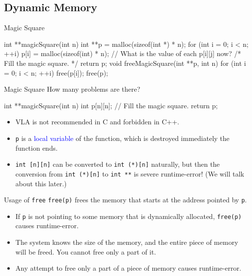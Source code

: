 \documentclass{beamer}
\newcommand{\blue}[1]{\textcolor{blue}{#1}}
\newcommand{\ttt}[1]{\texttt{#1}}
\theoremstyle{definition}
\begin{document}
\subsection{Dynamic Memory}

\begin{frame}[fragile]{Magic Square}
    \begin{cpp}
int **magicSquare(int n) {
  int **p = malloc(sizeof(int *) * n);
  for (int i = 0; i < n; ++i)
    p[i] = malloc(sizeof(int) * n);
  // What is the value of each p[i][j] now?
  /* Fill the magic square. */
  return p;
}
void freeMagicSquare(int **p, int n) {
  for (int i = 0; i < n; ++i)
    free(p[i]);
  free(p);
}
    \end{cpp}
\end{frame}

\begin{frame}[fragile]{Magic Square}
    How many problems are there?
    \begin{cpp}
int **magicSquare(int n) {
  int p[n][n];
  // Fill the magic square.
  return p;
}
    \end{cpp}
    \pause
    \begin{itemize}
        \item VLA is not recommended in C and forbidden in C++.
        \item \ttt{p} is a \blue{local variable} of the function, which is destroyed immediately the function ends.
        \item \ttt{int [n][n]} can be converted to \ttt{int (*)[n]} naturally, but then the conversion from \ttt{int (*)[n]} to \ttt{int **} is severe runtime-error! (We will talk about this later.)
    \end{itemize}
\end{frame}

\begin{frame}[fragile]{Usage of \ttt{free}}
    \ttt{free(p)} frees the memory that starts at the address pointed by \ttt{p}.
    \begin{itemize}
        \item If \ttt{p} is not pointing to some memory that is dynamically allocated, \ttt{free(p)} causes runtime-error.
        \item The system knows the size of the memory, and the entire piece of memory will be freed. You cannot free only a part of it.
        \item Any attempt to free only a part of a piece of memory causes runtime-error.
    \end{itemize}
\end{frame}
\end{document}

